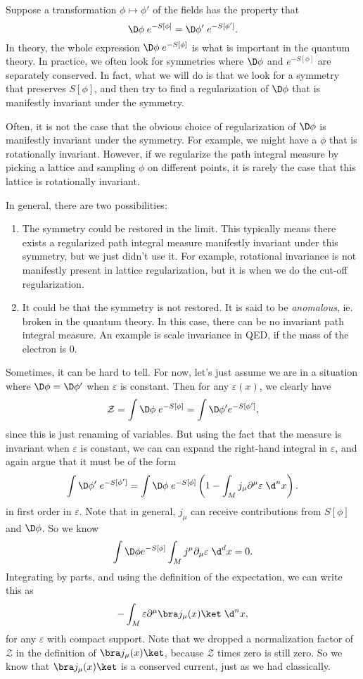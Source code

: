 \documentclass[a4paper]{article}
\begin{document}
Suppose a transformation $\phi \mapsto \phi'$ of the fields has the property that
\[
  \D \phi\; e^{-S[\phi]} = \D \phi'\; e^{-S[\phi']}.
\]
In theory, the whole expression $\D \phi\; e^{-S[\phi]}$ is what is important in the quantum theory. In practice, we often look for symmetries where $\D \phi$ and $e^{-S[\phi]}$ are separately conserved. In fact, what we will do is that we look for a symmetry that preserves $S[\phi]$, and then try to find a regularization of $\D \phi$ that is manifestly invariant under the symmetry.

Often, it is not the case that the obvious choice of regularization of $\D \phi$ is manifestly invariant under the symmetry. For example, we might have a $\phi$ that is rotationally invariant. However, if we regularize the path integral measure by picking a lattice and sampling $\phi$ on different points, it is rarely the case that this lattice is rotationally invariant.

In general, there are two possibilities:
\begin{enumerate}
  \item The symmetry could be restored in the limit. This typically means there exists a regularized path integral measure manifestly invariant under this symmetry, but we just didn't use it. For example, rotational invariance is not manifestly present in lattice regularization, but it is when we do the cut-off regularization.
  \item It could be that the symmetry is not restored. It is said to be \emph{anomalous}, ie. broken in the quantum theory. In this case, there can be no invariant path integral measure. An example is scale invariance in QED, if the mass of the electron is $0$.
\end{enumerate}
Sometimes, it can be hard to tell. For now, let's just assume we are in a situation where $\D \phi = \D \phi'$ when $\varepsilon$ is constant. Then for any $\varepsilon(x)$, we clearly have
\[
  \mathcal{Z} = \int \D \phi\; e^{-S [\phi]} = \int \D \phi' e^{-S[\phi']},
\]
since this is just renaming of variables. But using the fact that the measure is invariant when $\varepsilon$ is constant, we can can expand the right-hand integral in $\varepsilon$, and again argue that it must be of the form
\[
  \int \D \phi'\; e^{-S[\phi']} = \int \D \phi\; e^{-S[\phi]} \left(1 - \int_M j_\mu \partial^\mu \varepsilon\;  \d^n x\right).
\]
in first order in $\varepsilon$. Note that in general, $j_\mu$ can receive contributions from $S[\phi]$ and $\D \phi$. So we know
\[
  \int \D \phi e^{-S[\phi]} \int_M j^\mu \partial_\mu \varepsilon \;\d^d x = 0.
\]
Integrating by parts, and using the definition of the expectation, we can write this as
\[
  -\int_M \varepsilon \partial^\mu \bra j_\mu (x)\ket\; \d^n x,
\]
for any $\varepsilon$ with compact support. Note that we dropped a normalization factor of $\mathcal{Z}$ in the definition of $\bra j_\mu(x)\ket$, because $\mathcal{Z}$ times zero is still zero. So we know that $\bra j_\mu (x)\ket$ is a conserved current, just as we had classically.
\end{document}
